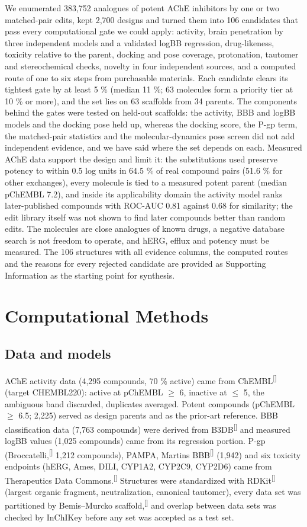 \documentclass[11pt,a4paper]{article}
\renewcommand{\cite}[1]{\textsuperscript{[\citenum{#1}]}}
\begin{document}
We enumerated 383,752 analogues of potent AChE inhibitors by one or two matched-pair edits, kept 2,700 designs and turned them into 106 candidates that pass every computational gate we could apply: activity, brain penetration by three independent models and a validated logBB regression, drug-likeness, toxicity relative to the parent, docking and pose coverage, protonation, tautomer and stereochemical checks, novelty in four independent sources, and a computed route of one to six steps from purchasable materials. Each candidate clears its tightest gate by at least 5 \% (median 11 \%; 63 molecules form a priority tier at 10 \% or more), and the set lies on 63 scaffolds from 34 parents. The components behind the gates were tested on held-out scaffolds: the activity, BBB and logBB models and the docking pose held up, whereas the docking score, the P-gp term, the matched-pair statistics and the molecular-dynamics pose screen did not add independent evidence, and we have said where the set depends on each. Measured AChE data support the design and limit it: the substitutions used preserve potency to within 0.5 log units in 64.5 \% of real compound pairs (51.6 \% for other exchanges), every molecule is tied to a measured potent parent (median pChEMBL 7.2), and inside its applicability domain the activity model ranks later-published compounds with ROC-AUC 0.81 against 0.68 for similarity; the edit library itself was not shown to find later compounds better than random edits. The molecules are close analogues of known drugs, a negative database search is not freedom to operate, and hERG, efflux and potency must be measured. The 106 structures with all evidence columns, the computed routes and the reasons for every rejected candidate are provided as Supporting Information as the starting point for synthesis.

\section{Computational Methods}
\label{sec:2}

\subsection{Data and models}
\label{sec:2.1}

AChE activity data (4,295 compounds, 70 \% active) came from ChEMBL\cite{chembl} (target CHEMBL220): active at pChEMBL $\geq$ 6, inactive at $\leq$ 5, the ambiguous band discarded, duplicates averaged. Potent compounds (pChEMBL $\geq$ 6.5; 2,225) served as design parents and as the prior-art reference. BBB classification data (7,763 compounds) were derived from B3DB\cite{b3db} and measured logBB values (1,025 compounds) came from its regression portion. P-gp (Broccatelli,\cite{brocc} 1,212 compounds), PAMPA, Martins BBB\cite{martins} (1,942) and six toxicity endpoints (hERG, Ames, DILI, CYP1A2, CYP2C9, CYP2D6) came from Therapeutics Data Commons.\cite{tdc} Structures were standardized with RDKit\cite{rdkit} (largest organic fragment, neutralization, canonical tautomer), every data set was partitioned by Bemis--Murcko scaffold,\cite{murcko} and overlap between data sets was checked by InChIKey before any set was accepted as a test set.
\end{document}
